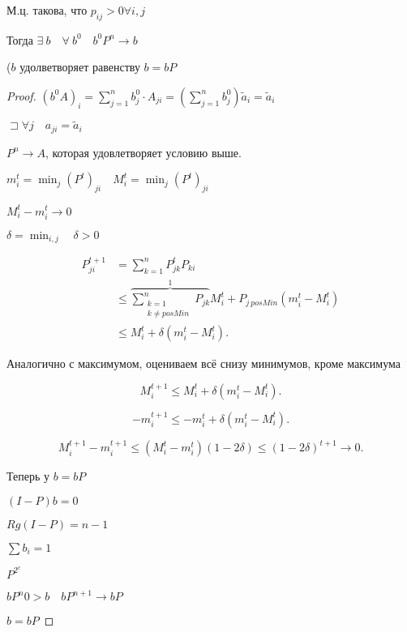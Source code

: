 \documentclass{book}
\newcommand{\tl}[1]{\widetilde{#1}}
\theoremstyle{definition}
\begin{document}
\begin{theorem}
    М.ц. такова, что $p_{ij} >0 \forall i, j$

    Тогда $\exists\ b\quad \forall\ b^0\quad b^0P^n \to b$

    ($b$ удолветворяет равенству  $b = bP$
\end{theorem}
\begin{proof}
    $(b^0A)_i = \sum_{j=1}^{n} b^0_j\cdot A_{ji} = \left( \sum_{j=1}^{n} b_j^0 \right) \tl a_i = \tl a_i$ 

    $\sqsupset \forall j\quad a_{ji} = \tl a_i$

    $P^n \to A$, которая  удовлетворяет условию выше.

    $m_i^t = \min_j (P^t)_{ji}\quad M_i^t = \min_j (P^t)_{ji}$

    $M^t_i - m_i^t \to  0$

    $\delta = \min_{i,j}\quad \delta >0$
    
\begin{align*}
    P_{ji}^{t+1} &= \sum_{k=1}^{n} P^t_{jk}P_{ki}\\
                 &\leqslant \overbrace{\sum_{\substack{k = 1\\k\neq posMin}}^{n} P_{jk}}^{1}M_i^t + P_{j\ posMin}(m_i^t - M_i^t)\\
                 &\leqslant  M_i^t + \delta\left( m_i^t - M_i^t \right)  
.\end{align*}

Аналогично с максимумом, оцениваем всё снизу минимумов, кроме максимума 



\[
    M_i^{t+1} \leqslant  M_i^t + \delta\left( m_i^t - M_i^t \right) 
.\] 

\[
    -m_i^{t+1} \leqslant  -m_i^t + \delta\left( m_i^t - M_i^t \right) 
.\] 

\[
    M_i^{t+1} - m_i^{t+1} \leqslant  \left( M_i^t - m_i^t \right) \left( 1-2\delta \right) \leqslant \left( 1-2\delta \right) ^{t+1} \to 0
.\] 

Теперь у $b = bP$

$(I-P)b = 0$

$Rg\left( I - P \right) = n-1$

$\sum b_i = 1$ 

$P^{2^c}$

$bP^n 0> b\quad bP^{n+1} \to bP$

$b = bP$
\end{proof}
\end{document}
